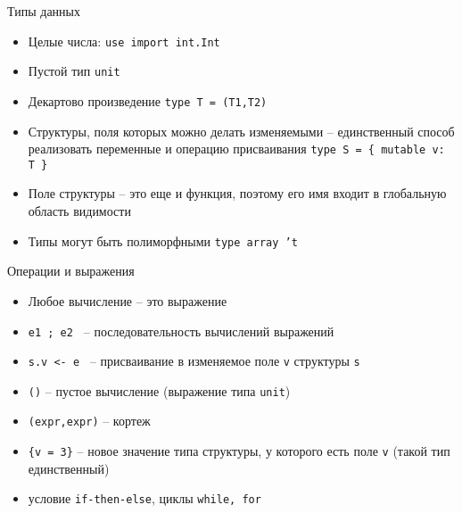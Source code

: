 \documentclass[hyperref={unicode=true}]{beamer}
\begin{document}
    \begin{frame}{Типы данных}
    \begin{itemize}
    \item
    Целые числа: \texttt{use import int.Int}
    \item
    Пустой тип \texttt{unit}
    \item
    Декартово произведение \texttt{type T = (T1,T2)}
    \item
    Структуры, поля которых можно делать изменяемыми --
    единственный способ реализовать переменные и операцию
    присваивания \texttt{type S = \{ mutable v: T \}}
    \item
    Поле структуры -- это еще и функция, поэтому его имя
    входит в глобальную область видимости
    \item
    Типы могут быть полиморфными \texttt{type array 't}
    \end{itemize}
    \end{frame}

    \begin{frame}{Операции и выражения}
    \begin{itemize}
    \item
    Любое вычисление -- это выражение
    \item
    \texttt{e1 ; e2 } -- последовательность вычислений выражений
    \item
    \texttt{s.v <- e } -- присваивание в изменяемое поле
    \texttt{v} структуры \texttt{s}
    \item
    \texttt{()} -- пустое вычисление (выражение типа \texttt{unit})
    \item
    \texttt{(expr,expr)} -- кортеж
    \item
    \texttt{\{v = 3\}} -- новое значение типа структуры, у которого
    есть поле \texttt{v} (такой тип единственный)
    \item
    условие \texttt{if-then-else}, циклы \texttt{while, for}
    \end{itemize}
    \end{frame}
\end{document}
